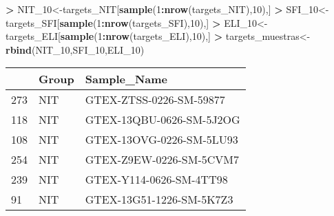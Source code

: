\documentclass[
]{article}
\newenvironment{Shaded}{\begin{snugshade}}{\end{snugshade}}
\newcommand{\DataTypeTok}[1]{\textcolor[rgb]{0.13,0.29,0.53}{#1}}
\newcommand{\DecValTok}[1]{\textcolor[rgb]{0.00,0.00,0.81}{#1}}
\newcommand{\KeywordTok}[1]{\textcolor[rgb]{0.13,0.29,0.53}{\textbf{#1}}}
\newcommand{\NormalTok}[1]{#1}
\newcommand{\OperatorTok}[1]{\textcolor[rgb]{0.81,0.36,0.00}{\textbf{#1}}}
\newcommand{\StringTok}[1]{\textcolor[rgb]{0.31,0.60,0.02}{#1}}
\begin{document}
\begin{Shaded}
\begin{Highlighting}[]
\OperatorTok{>}\StringTok{ }\NormalTok{NIT_}\DecValTok{10}\NormalTok{<-targets_NIT[}\KeywordTok{sample}\NormalTok{(}\DecValTok{1}\OperatorTok{:}\KeywordTok{nrow}\NormalTok{(targets_NIT),}\DecValTok{10}\NormalTok{),]}
\OperatorTok{>}\StringTok{ }\NormalTok{SFI_}\DecValTok{10}\NormalTok{<-targets_SFI[}\KeywordTok{sample}\NormalTok{(}\DecValTok{1}\OperatorTok{:}\KeywordTok{nrow}\NormalTok{(targets_SFI),}\DecValTok{10}\NormalTok{),]}
\OperatorTok{>}\StringTok{ }\NormalTok{ELI_}\DecValTok{10}\NormalTok{<-targets_ELI[}\KeywordTok{sample}\NormalTok{(}\DecValTok{1}\OperatorTok{:}\KeywordTok{nrow}\NormalTok{(targets_ELI),}\DecValTok{10}\NormalTok{),]}
\OperatorTok{>}\StringTok{ }\NormalTok{targets_muestras<-}\KeywordTok{rbind}\NormalTok{(NIT_}\DecValTok{10}\NormalTok{,SFI_}\DecValTok{10}\NormalTok{,ELI_}\DecValTok{10}\NormalTok{)}
\end{Highlighting}
\end{Shaded}

\begin{Shaded}
\end{Shaded}

\begin{longtable}[]{@{}lll@{}}
\toprule
& Group & Sample\_Name\tabularnewline
\midrule
\endhead
273 & NIT & GTEX-ZTSS-0226-SM-59877\tabularnewline
118 & NIT & GTEX-13QBU-0626-SM-5J2OG\tabularnewline
108 & NIT & GTEX-13OVG-0226-SM-5LU93\tabularnewline
254 & NIT & GTEX-Z9EW-0226-SM-5CVM7\tabularnewline
239 & NIT & GTEX-Y114-0626-SM-4TT98\tabularnewline
91 & NIT & GTEX-13G51-1226-SM-5K7Z3\tabularnewline
\bottomrule
\end{longtable}
\end{document}
